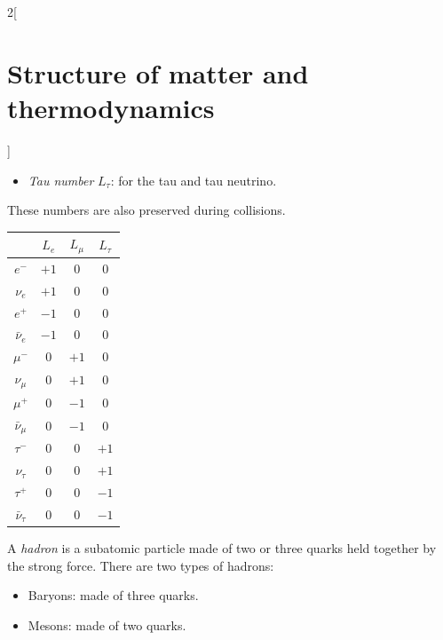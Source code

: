 \documentclass[../../../main_physics.tex]{subfiles}
\begin{document}
\begin{multicols}{2}[\section{Structure of matter and thermodynamics}]
\begin{definition}
\begin{itemize}
      \item \emph{Tau number} $L_\tau$: for the tau and tau neutrino.
    \end{itemize}
    These numbers are also preserved during collisions.
    \begin{center}
      \begin{minipage}{\linewidth}
        \centering
        \begin{tabular}{cccc}
                           & $L_e$ & $L_\mu$ & $L_\tau$ \\
          \hline
          $e^-$            & $+1$  & 0       & 0        \\
          $\nu_e$          & $+1$  & 0       & 0        \\
          $e^+$            & $-1$  & 0       & 0        \\
          $\bar{\nu}_e$    & $-1$  & 0       & 0        \\
          $\mu^-$          & 0     & $+1$    & 0        \\
          $\nu_\mu$        & 0     & $+1$    & 0        \\
          $\mu^+$          & 0     & $-1$    & 0        \\
          $\bar{\nu}_\mu$  & 0     & $-1$    & 0        \\
          $\tau^-$         & 0     & 0       & $+1$     \\
          $\nu_\tau$       & 0     & 0       & $+1$     \\
          $\tau^+$         & 0     & 0       & $-1$     \\
          $\bar{\nu}_\tau$ & 0     & 0       & $-1$     \\
        \end{tabular}
      \end{minipage}
    \end{center}
  \end{definition}
  \begin{definition}[Hadron]
    A \emph{hadron} is a subatomic particle made of two or three quarks held together by the strong force. There are two types of hadrons:
    \begin{itemize}
      \item Baryons: made of three quarks.
      \item Mesons: made of two quarks.
    \end{itemize}
  \end{definition}
  \begin{definition}\label{SMT_color}

\end{definition}
\end{multicols}
\end{document}

